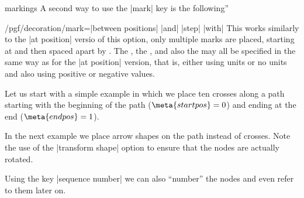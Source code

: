 \begin{decoration}{markings}
  A second way to use the |mark| key is the following''
   \begin{key}{/pgf/decoration/mark=|between positions|
       |and|  |step| 
      |with| }
    This works similarly to the |at position| versio of this option,
    only multiple marks are placed, starting at  and
    then spaced apart by . The , the
    , and also the  may all be specified
    in the same way as for the |at position| version, that is, either
    using units or no units and also using positive or negative
    values.

    Let us start with a simple example in which we place ten crosses
    along a path starting with the beginning of the 
    path ($\meta{start pos} = 0$) and ending at the end ($\meta{end
      pos} = 1$). 
\begin{codeexample}[]
\end{codeexample}      

    In the next example we place arrow shapes on the path instead of
    crosses. Note the use of the |transform shape| option to ensure
    that the nodes are actually rotated.
\begin{codeexample}[]
\end{codeexample}      

    Using the key |sequence number| we can also ``number'' the nodes
    and even refer to them later on.
\begin{codeexample}[]
\end{codeexample}      


\end{key}
\end{decoration}
